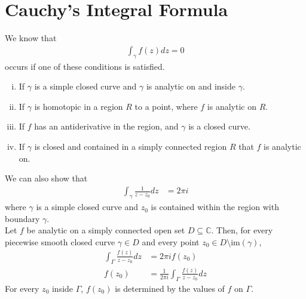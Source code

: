 \documentclass[10pt]{extarticle}
\newcommand{\C}{\mathbb{C}}
\begin{document}
  \section{Cauchy's Integral Formula}%
  We know that
  \begin{align*}
    \int_{\gamma} f(z) dz = 0
  \end{align*}
  occurs if one of these conditions is satisfied.
  \begin{enumerate}[(i)]
    \item If $\gamma$ is a simple closed curve and $\gamma$ is analytic on and inside $\gamma$.
    \item If $\gamma$ is homotopic in a region $R$ to a point, where $f$ is analytic on $R$.
    \item If $f$ has an antiderivative in the region, and $\gamma$ is a closed curve.
    \item If $\gamma$ is closed and contained in a simply connected region $R$ that $f$ is analytic on.
  \end{enumerate}
  We can also show that
  \begin{align*}
    \int_{\gamma}\frac{1}{z-z_0}dz &= 2\pi i
  \end{align*}
  where $\gamma$ is a simple closed curve and $z_0$ is contained within the region with boundary $\gamma$.\\

  Let $f$ be analytic on a simply connected open set $D\subseteq \C$. Then, for every piecewise smooth closed curve $\gamma\in D$ and every point $z_0\in D\setminus \text{im}(\gamma)$,
  \begin{align*}
    \int_{\Gamma}\frac{f(z)}{z-z_0}dz &= 2\pi i f(z_0)\\
    f(z_0) &= \frac{1}{2\pi i}\int_{\Gamma}\frac{f(z)}{z-z_0}dz
  \end{align*}
  For every $z_0$ inside $\Gamma$, $f(z_0)$ is determined by the values of $f$ on $\Gamma$.\\
\end{document}
